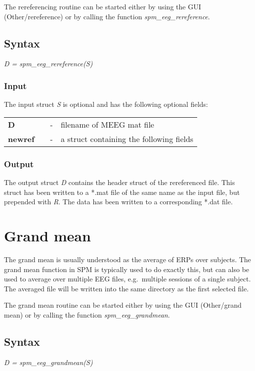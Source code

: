 The rereferencing routine can be started either by using the GUI
(Other/rereference) or by calling the function
\textit{spm\_eeg\_rereference}.

\subsection{Syntax}
\textit{D = spm\_eeg\_rereference(S)}
\\

\subsubsection{Input}
The input struct {\it S} is optional and has the following optional fields:

\begin{tabular}{llcp{9cm}}
{\bf D} & & - & filename of MEEG mat file\\
{\bf newref}&  & - & a struct containing the following fields\\
\end{tabular}

\subsubsection{Output}
The output struct {\it D} contains the header struct of the rereferenced
file. This struct has been written to a *.mat file of the same name as
the input file, but prepended with {\it R}. The data has been
written to a corresponding *.dat file.


\section{Grand mean}
The grand mean is usually understood as the average of ERPs over
subjects. The grand mean function in SPM is typically used to do
exactly this, but can also be used to average over multiple
EEG files, e.g.~multiple sessions of a single subject. The averaged
file will be written into the same directory as the first selected
file.

The grand mean routine can be started either by using the GUI
(Other/grand mean) or by calling the function
\textit{spm\_eeg\_grandmean}.

\subsection{Syntax}
\textit{D = spm\_eeg\_grandmean(S)}
\\

